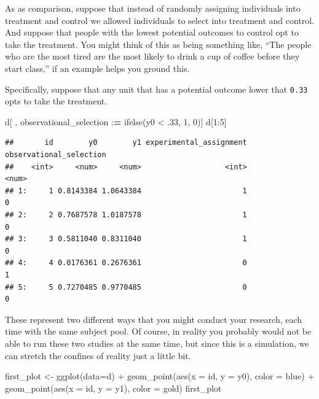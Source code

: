 \documentclass[
]{article}
\newenvironment{Shaded}{\begin{snugshade}}{\end{snugshade}}
\newcommand{\AttributeTok}[1]{\textcolor[rgb]{0.77,0.63,0.00}{#1}}
\newcommand{\DecValTok}[1]{\textcolor[rgb]{0.00,0.00,0.81}{#1}}
\newcommand{\ErrorTok}[1]{\textcolor[rgb]{0.64,0.00,0.00}{\textbf{#1}}}
\newcommand{\FunctionTok}[1]{\textcolor[rgb]{0.00,0.00,0.00}{#1}}
\newcommand{\NormalTok}[1]{#1}
\newcommand{\OtherTok}[1]{\textcolor[rgb]{0.56,0.35,0.01}{#1}}
\newcommand{\SpecialCharTok}[1]{\textcolor[rgb]{0.00,0.00,0.00}{#1}}
\begin{document}
As as comparison, suppose that instead of randomly assigning individuals into treatment and control we allowed individuals to select into treatment and control. And suppose that people with the lowest potential outcomes to control opt to take the treatment. You might think of this as being something like, ``The people who are the most tired are the most likely to drink a cup of coffee before they start class,'' if an example helps you ground this.

Specifically, suppose that any unit that has a potential outcome lower that \texttt{0.33} opts to take the treatment.

\begin{Shaded}
\begin{Highlighting}[]
\NormalTok{d[ , observational\_selection }\SpecialCharTok{:}\ErrorTok{=} \FunctionTok{ifelse}\NormalTok{(y0 }\SpecialCharTok{\textless{}}\NormalTok{ .}\DecValTok{33}\NormalTok{, }\DecValTok{1}\NormalTok{, }\DecValTok{0}\NormalTok{)]}
\NormalTok{d[}\DecValTok{1}\SpecialCharTok{:}\DecValTok{5}\NormalTok{]}
\end{Highlighting}
\end{Shaded}

\begin{verbatim}
##       id        y0        y1 experimental_assignment observational_selection
##    <int>     <num>     <num>                   <int>                   <num>
## 1:     1 0.8143384 1.0643384                       1                       0
## 2:     2 0.7687578 1.0187578                       1                       0
## 3:     3 0.5811040 0.8311040                       1                       0
## 4:     4 0.0176361 0.2676361                       0                       1
## 5:     5 0.7270485 0.9770485                       0                       0
\end{verbatim}

These represent two different ways that you might conduct your research, each time with the same subject pool. Of course, in reality you probably would not be able to run these two studies at the same time, but since this is a simulation, we can stretch the confines of reality just a little bit.

\begin{Shaded}
\begin{Highlighting}[]
\NormalTok{first\_plot }\OtherTok{\textless{}{-}} \FunctionTok{ggplot}\NormalTok{(}\AttributeTok{data=}\NormalTok{d) }\SpecialCharTok{+} 
  \FunctionTok{geom\_point}\NormalTok{(}\FunctionTok{aes}\NormalTok{(}\AttributeTok{x =}\NormalTok{ id, }\AttributeTok{y =}\NormalTok{ y0), }\AttributeTok{color =}\NormalTok{ blue) }\SpecialCharTok{+} 
  \FunctionTok{geom\_point}\NormalTok{(}\FunctionTok{aes}\NormalTok{(}\AttributeTok{x =}\NormalTok{ id, }\AttributeTok{y =}\NormalTok{ y1), }\AttributeTok{color =}\NormalTok{ gold)}
\NormalTok{first\_plot  }
\end{Highlighting}
\end{Shaded}
\end{document}
